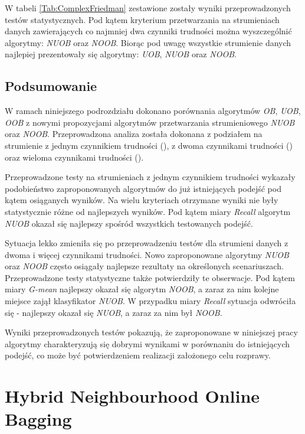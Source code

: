 \noindent W tabeli \ref{Tab:ComplexFriedman} zestawione zostały wyniki przeprowadzonych testów statystycznych. Pod kątem kryterium przetwarzania na strumieniach danych zawierających co najmniej dwa czynniki trudności można wyszczególnić algorytmy: \textit{NUOB} oraz \textit{NOOB}. Biorąc pod uwagę wszystkie strumienie danych najlepiej prezentowały się algorytmy: \textit{UOB}, \textit{NUOB} oraz \textit{NOOB}.

\subsection{Podsumowanie}

\noindent W ramach niniejszego podrozdziału dokonano porównania algorytmów \textit{OB}, \textit{UOB}, \textit{OOB} z nowymi propozycjami algorytmów przetwarzania strumieniowego \textit{NUOB} oraz \textit{NOOB}. Przeprowadzona analiza została dokonana z podziałem na strumienie z jednym czynnikiem trudności (), z dwoma czynnikami trudności () oraz wieloma czynnikami trudności ().

Przeprowadzone testy na strumieniach z jednym czynnikiem trudności wykazały podobieństwo zaproponowanych algorytmów do już istniejących podejść pod kątem osiąganych wyników. Na wielu kryteriach otrzymane wyniki nie były statystycznie różne od najlepszych wyników. Pod kątem miary \textit{Recall} algorytm \textit{NUOB} okazał się najlepszy spośród wszystkich testowanych podejść.

Sytuacja lekko zmieniła się po przeprowadzeniu testów dla strumieni danych z dwoma i więcej czynnikami trudności. Nowo zaproponowane algorytmy \textit{NUOB} oraz \textit{NOOB} często osiągały najlepsze rezultaty na określonych scenariuszach. Przeprowadzone testy statystyczne także potwierdziły te obserwacje. Pod kątem miary \textit{G-mean} najlepszy okazał się algorytm \textit{NOOB}, a zaraz za nim kolejne miejsce zajął klasyfikator \textit{NUOB}. W przypadku miary \textit{Recall} sytuacja odwróciła się - najlepszy okazał się \textit{NUOB}, a zaraz za nim był \textit{NOOB}.

Wyniki przeprowadzonych testów pokazują, że zaproponowane w niniejszej pracy algorytmy charakteryzują się dobrymi wynikami w porównaniu do istniejących podejść, co może być potwierdzeniem realizacji założonego celu rozprawy.

\section{Hybrid Neighbourhood Online Bagging}

